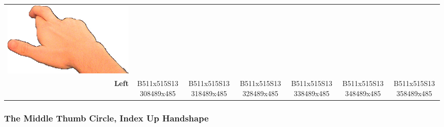 \documentclass{article}
\begin{document}
\begin{center}
\begin{tabular}{r*{6}{c}}
\includegraphics[scale=0.1]{images/03-09-6.jpg}\\
\textbf{Left}&
B511x515S13308489x485&
B511x515S13318489x485&
B511x515S13328489x485&
B511x515S13338489x485&
B511x515S13348489x485&
B511x515S13358489x485\\
\end{tabular}
\end{center}

\subsubsection{The Middle Thumb Circle, Index Up Handshape}
\end{document}
